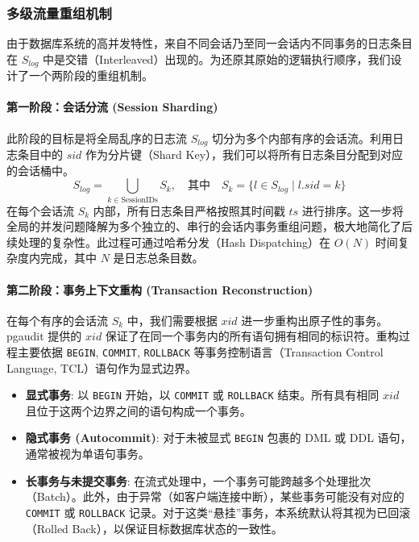 \subsubsection{多级流量重组机制}
由于数据库系统的高并发特性，来自不同会话乃至同一会话内不同事务的日志条目在 $S_{log}$ 中是交错（Interleaved）出现的。为还原其原始的逻辑执行顺序，我们设计了一个两阶段的重组机制。

\paragraph{第一阶段：会话分流 (Session Sharding)}
此阶段的目标是将全局乱序的日志流 $S_{log}$ 切分为多个内部有序的会话流。利用日志条目中的 $sid$ 作为分片键（Shard Key），我们可以将所有日志条目分配到对应的会话桶中。
\begin{equation}
    S_{log} = \bigcup_{k \in \text{SessionIDs}} S_k, \quad \text{其中} \quad S_k = \{ l \in S_{log} \mid l.sid = k \}
\end{equation}
在每个会话流 $S_k$ 内部，所有日志条目严格按照其时间戳 $ts$ 进行排序。这一步将全局的并发问题降解为多个独立的、串行的会话内事务重组问题，极大地简化了后续处理的复杂性。此过程可通过哈希分发（Hash Dispatching）在 $O(N)$ 时间复杂度内完成，其中 $N$ 是日志总条目数。

\paragraph{第二阶段：事务上下文重构 (Transaction Reconstruction)}
在每个有序的会话流 $S_k$ 中，我们需要根据 $xid$ 进一步重构出原子性的事务。pgaudit \cite{pgaudit} 提供的 $xid$ 保证了在同一个事务内的所有语句拥有相同的标识符。重构过程主要依据 \texttt{BEGIN}, \texttt{COMMIT}, \texttt{ROLLBACK} 等事务控制语言（Transaction Control Language, TCL）语句作为显式边界。
\begin{itemize}
    \item \textbf{显式事务}: 以 \texttt{BEGIN} 开始，以 \texttt{COMMIT} 或 \texttt{ROLLBACK} 结束。所有具有相同 $xid$ 且位于这两个边界之间的语句构成一个事务。
    \item \textbf{隐式事务 (Autocommit)}: 对于未被显式 \texttt{BEGIN} 包裹的 DML 或 DDL 语句，通常被视为单语句事务。
    \item \textbf{长事务与未提交事务}: 在流式处理中，一个事务可能跨越多个处理批次（Batch）。此外，由于异常（如客户端连接中断），某些事务可能没有对应的 \texttt{COMMIT} 或 \texttt{ROLLBACK} 记录。对于这类“悬挂”事务，本系统默认将其视为已回滚（Rolled Back），以保证目标数据库状态的一致性。
\end{itemize}

